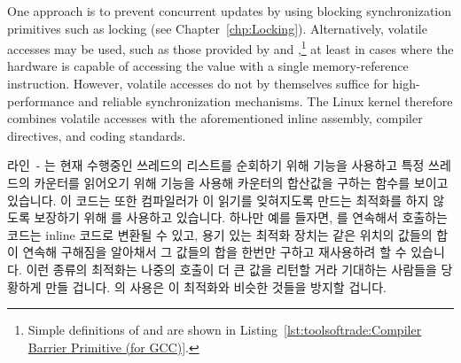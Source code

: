 \begin{lineref}
\begin{lineref}
{	One approach is to prevent concurrent updates by using
	blocking synchronization primitives such as locking
	(see Chapter~\ref{chp:Locking}).
	Alternatively, volatile accesses may be used, such as those provided
	by  and ,\footnote{
		Simple definitions of  and
		 are shown in
		Listing~\ref{lst:toolsoftrade:Compiler Barrier Primitive (for GCC)}.}
	at least in cases where the hardware is capable of accessing
	the value with a single memory-reference instruction.
	However, volatile accesses do not by themselves suffice for
	high-performance and reliable synchronization mechanisms.
	The Linux kernel therefore combines volatile accesses with
	the aforementioned inline assembly, compiler directives, and
	coding standards.
	\fi
} \QuickQuizEnd

라인~-
는 현재 수행중인 쓰레드의 리스트를 순회하기 위해  기능을
사용하고 특정 쓰레드의 카운터를 읽어오기 위해  기능을 사용해
카운터의 합산값을 구하는 함수를 보이고 있습니다.
이 코드는 또한 컴파일러가 이 읽기를 잊혀지도록 만드는 최적화를 하지 않도록
보장하기 위해  를 사용하고 있습니다.
하나만 예를 들자면,  를 연속해서 호출하는 코드는 inline 코드로
변환될 수 있고, 용기 있는 최적화 장치는 같은 위치의 값들의 합이 연속해 구해짐을
알아채서 그 값들의 합을 한번만 구하고 재사용하려 할 수 있습니다.
이런 종류의 최적화는 나중의  호출이 더 큰 값을 리턴할 거라
기대하는 사람들을 당황하게 만들 겁니다.
 의 사용은 이 최적화와 비슷한 것들을 방지할 겁니다.

\end{lineref}


\end{lineref}
